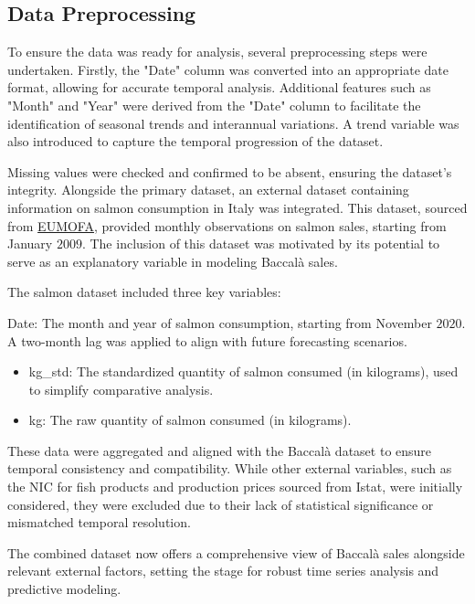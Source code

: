 \documentclass[10pt,twocolumn,letterpaper]{article}
\begin{document}
\subsection{Data Preprocessing}
To ensure the data was ready for analysis, several preprocessing steps were undertaken. Firstly, the "Date" column was converted into an appropriate date format, allowing for accurate temporal analysis. Additional features such as "Month" and "Year" were derived from the "Date" column to facilitate the identification of seasonal trends and interannual variations. A trend variable was also introduced to capture the temporal progression of the dataset.

Missing values were checked and confirmed to be absent, ensuring the dataset's integrity. Alongside the primary dataset, an external dataset containing information on salmon consumption in Italy was integrated. This dataset, sourced from \href{https://eumofa.eu/first-sale-weekly-data}{EUMOFA}, provided monthly observations on salmon sales, starting from January $2009$. The inclusion of this dataset was motivated by its potential to serve as an explanatory variable in modeling Baccalà sales.

The salmon dataset included three key variables:

Date: The month and year of salmon consumption, starting from November $2020$. A two-month lag was applied to align with future forecasting scenarios.
\begin{itemize}
    \item kg\_std: The standardized quantity of salmon consumed (in kilograms), used to simplify comparative analysis.
    \item kg: The raw quantity of salmon consumed (in kilograms).
\end{itemize}

These data were aggregated and aligned with the Baccalà dataset to ensure temporal consistency and compatibility. While other external variables, such as the NIC for fish products and production prices sourced from Istat, were initially considered, they were excluded due to their lack of statistical significance or mismatched temporal resolution.

The combined dataset now offers a comprehensive view of Baccalà sales alongside relevant external factors, setting the stage for robust time series analysis and predictive modeling.
\end{document}
